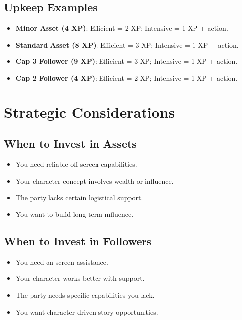 \subsection*{Upkeep Examples}
\label{sec:upkeep-examples}
\begin{itemize}
  \item \textbf{Minor Asset (4 XP)}: Efficient = 2 XP; Intensive = 1 XP + action.
  \item \textbf{Standard Asset (8 XP)}: Efficient = 3 XP; Intensive = 1 XP + action.
  \item \textbf{Cap 3 Follower (9 XP)}: Efficient = 3 XP; Intensive = 1 XP + action.
  \item \textbf{Cap 2 Follower (4 XP)}: Efficient = 2 XP; Intensive = 1 XP + action.
\end{itemize}

\section{Strategic Considerations}
\label{sec:asset-follower-strategy}

\subsection*{When to Invest in Assets}
\label{sec:invest-assets}
\begin{itemize}
\item You need reliable off-screen capabilities.
\item Your character concept involves wealth or influence.
\item The party lacks certain logistical support.
\item You want to build long-term influence.
\end{itemize}

\subsection*{When to Invest in Followers}
\label{sec:invest-followers}
\begin{itemize}
\item You need on-screen assistance.
\item Your character works better with support.
\item The party needs specific capabilities you lack.
\item You want character-driven story opportunities.
\end{itemize}

